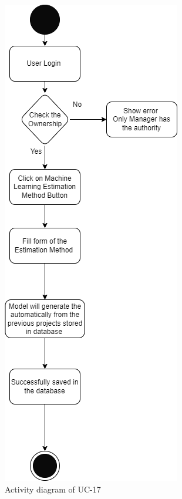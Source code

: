\begin{figure}[H]
    \centering
    \includegraphics[scale=0.7]{./diagrams/Activity Diagram/ad-17.png}
    \caption{Activity diagram of UC-17}
    \label{fig:act-17}

\end{figure}


